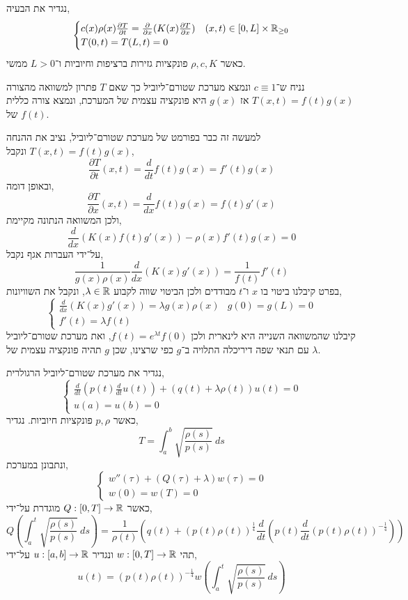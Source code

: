 \question{}
נגדיר את הבעיה,
\[
	\begin{cases}
		c(x) \rho(x) \frac{\partial T}{\partial t} = \frac{\partial}{\partial x} (K(x) \frac{\partial T}{\partial x}) & (x, t) \in [0, L] \times \mathbb{R}_{\ge 0} \\
		T(0, t) = T(L, t) = 0
	\end{cases}
\]
כאשר $\rho, c, K$ פונקציות גזירות ברציפות וחיוביות ו־$L > 0$ ממשי.

נניח ש־$c \equiv 1$ ונמצא מערכת שטורם־ליוביל כך שאם $T$ פתרון למשוואה מהצורה $T(x, t) = f(t) g(x)$ אז $g(x)$ היא פונקציה עצמית של המערכת, ונמצא צורה כללית של $f(t)$.
\begin{solution}
	למעשה זה כבר בפורמט של מערכת שטורם־ליוביל, נציב את ההנחה $T(x, t) = f(t) g(x)$ ונקבל,
	\[
		\frac{\partial T}{\partial t}(x, t)
		= \frac{d}{dt} f(t) g(x)
		= f'(t) g(x)
	\]
	ובאופן דומה,
	\[
		\frac{\partial T}{\partial x}(x, t)
		= \frac{d}{dx} f(t) g(x)
		= f(t) g'(x)
	\]
	ולכן המשוואה הנתונה מקיימת,
	\[
		 \frac{d}{dx} (K(x) f(t) g'(x)) - \rho(x) f'(t) g(x) = 0
	\]
	על־ידי העברות אגף נקבל,
	\[
		\frac{1}{g(x) \rho(x)} \frac{d}{dx} (K(x) g'(x))
		= \frac{1}{f(t)} f'(t)
	\]
	בפרט קיבלנו ביטוי בו $x$ ו־$t$ מבודדים ולכן הביטוי שווה לקבוע $\lambda \in \mathbb{R}$, ונקבל את השוויונות,
	\[
		\begin{cases}
			\frac{d}{dx} (K(x) g'(x)) = \lambda g(x) \rho(x) & g(0) = g(L) = 0 \\
			f'(t) = \lambda f(t)
		\end{cases}
	\]
	קיבלנו שהמשוואה השנייה היא לינארית ולכן $f(t) = e^{\lambda t} f(0)$, ואת מערכת שטורם־ליוביל עם תנאי שפה דיריכלה התלויה ב־$g$ כפי שרצינו, שכן $g$ תהיה פונקציה עצמית של $\lambda$.
\end{solution}

\question{}
נגדיר את מערכת שטורם־ליוביל הרגולרית,
\[
	\begin{cases}
		\frac{d}{dt} (p(t) \frac{d}{dt} u(t)) + (q(t) + \lambda \rho(t)) u(t) = 0 \\
		u(a) = u(b) = 0
	\end{cases}
	\tag{1}
\]
כאשר $p, \rho$ פונקציות חיוביות.
נגדיר,
\[
	T = \int_{a}^{b} \sqrt{\frac{\rho(s)}{p(s)}}\ ds
\]
ונתבונן במערכת,
\[
	\begin{cases}
		w''(\tau) + (Q(\tau) + \lambda) w(\tau) = 0 \\
		w(0) = w(T) = 0
	\end{cases}
	\tag{2}
\]
כאשר $Q : [0, T] \to \mathbb{R}$ מוגדרת על־ידי,
\[
	Q\left(\int_{a}^{t} \sqrt{\frac{\rho(s)}{p(s)}}\ ds\right)
	= \frac{1}{\rho(t)} \left(q(t) + {(p(t) \rho(t))}^{\frac{1}{4}} \frac{d}{dt}\left(p(t) \frac{d}{dt}{(p(t) \rho(t))}^{-\frac{1}{4}}\right)\right)
\]
תהי $w : [0, T] \to \mathbb{R}$ ונגדיר $u : [a, b] \to \mathbb{R}$ על־ידי,
\[
	u(t)
	= {(p(t) \rho(t))}^{-\frac{1}{4}} w\left(\int_{a}^{t} \sqrt{\frac{\rho(s)}{p(s)}}\ ds\right)
\]

